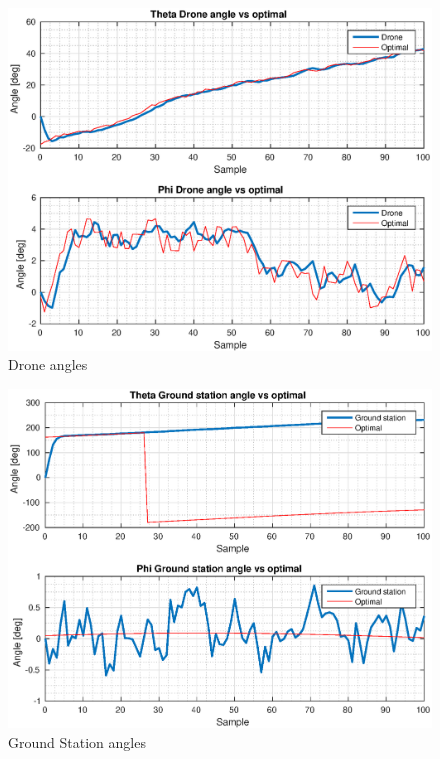 \begin{figure}[h]
	\centering
	\includegraphics[width=1\textwidth]{figures/Drone_angles.eps}
	\caption{Drone angles}
   	\label{fig:Drone_angles}
\end{figure}

\begin{figure}[h]
	\centering
	\includegraphics[width=1\textwidth]{figures/GS_angles.eps}
	\caption{Ground Station angles}
   	\label{fig:GS_angles}
\end{figure}